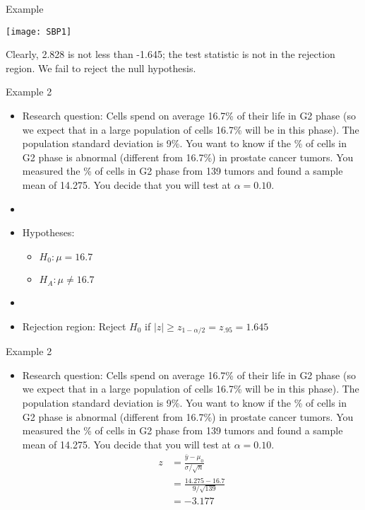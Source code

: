 \documentclass[xcolor=dvipsnames]{beamer}
\begin{document}
\begin{frame}{Example}
	\begin{center}
		\texttt{[image: SBP1]}
	\end{center}

\vspace{-10pt}
Clearly, 2.828 is not less than -1.645; the test statistic is not in the rejection region. We fail to reject the null hypothesis.
\end{frame}

\begin{frame}{Example 2}
	\begin{itemize}
		\item Research question: Cells spend on average 16.7\% of their life in G2 phase (so we expect that in a large population of cells 16.7\% will be in this phase). The population standard deviation is 9\%. You want to know if the \% of cells in G2 phase is abnormal (different from 16.7\%) in prostate cancer tumors. You measured the \% of cells in G2 phase from 139 tumors and found a sample mean of 14.275. You decide that you will test at $\alpha = 0.10$.
		\item[]
		\item Hypotheses:
		\begin{itemize}
			\item $H_0: \mu = 16.7$ 
			\item $H_A: \mu \neq 16.7$ 
		\end{itemize}
	\item[]
	\item Rejection region: Reject $H_0$ if $|z| \geq z_{1-\alpha / 2} = z_{.95} = 1.645$
	\end{itemize}
\end{frame}

\begin{frame}{Example 2}
	\begin{itemize}
		\item Research question: Cells spend on average 16.7\% of their life in G2 phase (so we expect that in a large population of cells 16.7\% will be in this phase). The population standard deviation is 9\%. You want to know if the \% of cells in G2 phase is abnormal (different from 16.7\%) in prostate cancer tumors. You measured the \% of cells in G2 phase from 139 tumors and found a sample mean of 14.275. You decide that you will test at $\alpha = 0.10$.
		\begin{align*}
			z &= \frac{\bar{y} - \mu_0}{\sigma / \sqrt{n}} \\
			&= \frac{14.275 - 16.7}{9 / \sqrt{139}} \\
			&= -3.177
		\end{align*}
	\end{itemize}
\end{frame}
\end{document}
